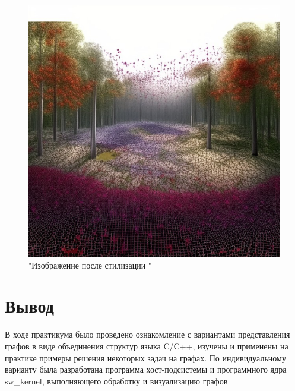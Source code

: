 \begin{figure}[h!]
	\centering
	\includegraphics[scale=0.7]{img/result.jpeg} %
	\caption{"Изображение после стилизации "}
	\label{img:result}
\end{figure} 
\clearpage
\section{Вывод}
В ходе практикума было проведено ознакомление с вариантами представления  графов в виде объединения структур языка C/C++, изучены и применены на практике примеры решения некоторых задач на графах.
По индивидуальному варианту была разработана программа хост-подсистемы и программного ядра 
sw\_kernel, выполняющего обработку и визуализацию графов